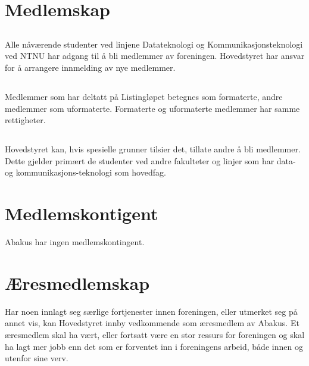 \section{Medlemskap}

\subsection{}
Alle nåværende studenter ved linjene Datateknologi og Kommunikasjonsteknologi
ved NTNU har adgang til å bli medlemmer av foreningen. Hovedstyret har ansvar
for å arrangere innmelding av nye medlemmer.

\subsection{}
Medlemmer som har deltatt på Listingløpet betegnes som formaterte, andre
medlemmer som uformaterte. Formaterte og uformaterte medlemmer har samme
rettigheter.

\subsection{}
Hovedstyret kan, hvis spesielle grunner tilsier det, tillate andre å bli
medlemmer. Dette gjelder primært de studenter ved andre fakulteter og linjer
som har data- og kommunikasjons-teknologi som hovedfag.

\section{Medlemskontigent}
Abakus har ingen medlemskontingent.

\section{Æresmedlemskap}
Har noen innlagt seg særlige fortjenester innen foreningen, eller utmerket seg
på annet vis, kan Hovedstyret innby vedkommende som æresmedlem av Abakus. Et
æresmedlem skal ha vært, eller fortsatt være en stor ressurs for foreningen og
skal ha lagt mer jobb enn det som er forventet inn i foreningens arbeid, både
innen og utenfor sine verv.

